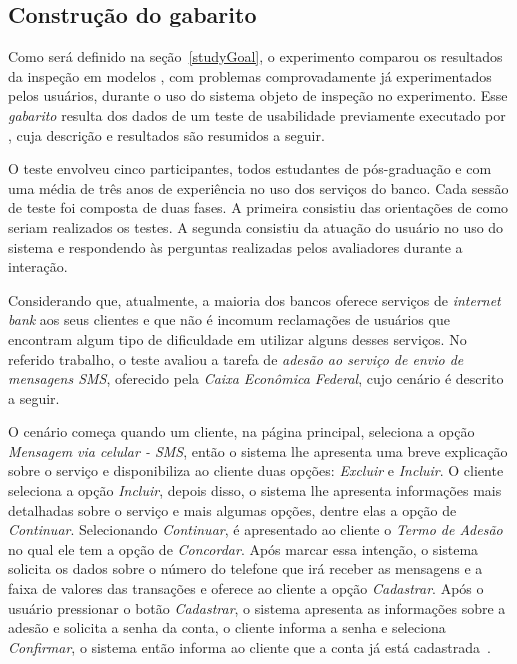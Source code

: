 \subsection{Construção do gabarito}
\label{initialExperiments}

Como será definido na seção~\ref{studyGoal}, o experimento comparou os
resultados   da   inspeção   em   modelos   \aladim,   com   problemas
comprovadamente  já experimentados  pelos usuários,  durante o  uso do
sistema  objeto  de  inspeção  no experimento.   Esse  {\em  gabarito}
resulta dos dados de um teste de usabilidade previamente executado por
,  cuja  descrição  e  resultados  são
resumidos a seguir.

O   teste   envolveu   cinco   participantes,  todos   estudantes   de
pós-graduação e com  uma média de três anos de  experiência no uso dos
serviços do banco.   Cada sessão de teste foi  composta de duas fases.
A  primeira consistiu  das orientações  de como  seriam  realizados os
testes.  A segunda consistiu da atuação do usuário no uso do sistema e
respondendo  às  perguntas  realizadas  pelos  avaliadores  durante  a
interação.

Considerando que, atualmente, a maioria dos bancos oferece serviços de
{\it internet bank} aos seus  clientes e que não é incomum reclamações
de usuários que encontram algum tipo de dificuldade em utilizar alguns
desses serviços.   No referido trabalho,  o teste avaliou a  tarefa de
{\em adesão ao serviço de envio de mensagens SMS}, oferecido pela {\it
  Caixa Econômica Federal}, cujo cenário é descrito a seguir.

\begin{citacao}

  O cenário começa quando um cliente, na página principal, seleciona a
  opção  {\em  Mensagem  via  celular  - SMS},  então  o  sistema  lhe
  apresenta uma  breve explicação sobre  o serviço e  disponibiliza ao
  cliente  duas opções:  {\em  Excluir} e  {\em  Incluir}.  O  cliente
  seleciona  a  opção  {\em  Incluir},  depois disso,  o  sistema  lhe
  apresenta informações mais detalhadas sobre o serviço e mais algumas
  opções, dentre  elas a opção de {\em  Continuar}.  Selecionando {\em
    Continuar}, é  apresentado ao cliente  o {\em Termo de  Adesão} no
  qual ele tem a opção de {\em Concordar}.  Após marcar essa intenção,
  o  sistema solicita  os dados  sobre o  número do  telefone  que irá
  receber as mensagens  e a faixa de valores  das transações e oferece
  ao cliente  a opção  {\em Cadastrar}.  Após  o usuário  pressionar o
  botão {\em  Cadastrar}, o sistema  apresenta as informações  sobre a
  adesão e  solicita a  senha da  conta, o cliente  informa a  senha e
  seleciona {\em Confirmar}, o sistema  então informa ao cliente que a
  conta já está cadastrada~\cite[p.~128]{CostaNeto:etal:2011}.

\end{citacao}

